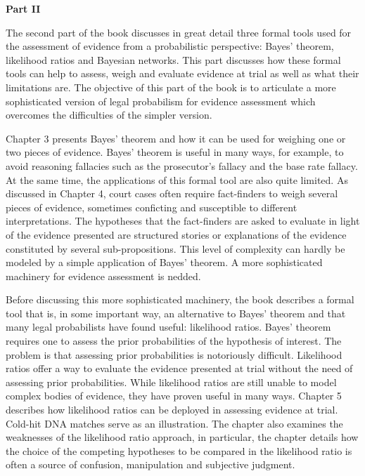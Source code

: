 \documentclass[10pt,dvipsnames,enabledeprecatedfontcommands]{scrartcl}
\begin{document}
\vspace{3mm}

\noindent \textbf{Part II}

\noindent The second part of the book discusses in great detail three
formal tools used for the assessment of evidence from a probabilistic
perspective: Bayes' theorem, likelihood ratios and Bayesian networks.
This part discusses how these formal tools can help to assess, weigh and
evaluate evidence at trial as well as what their limitations are. The
objective of this part of the book is to articulate a more sophisticated
version of legal probabilism for evidence assessment which overcomes the
difficulties of the simpler version.

Chapter 3 presents Bayes' theorem and how it can be used for weighing
one or two pieces of evidence. Bayes' theorem is useful in many ways,
for example, to avoid reasoning fallacies such as the prosecutor's
fallacy and the base rate fallacy. At the same time, the applications of
this formal tool are also quite limited. As discussed in Chapter 4,
court cases often require fact-finders to weigh several pieces of
evidence, sometimes conficting and susceptible to different
interpretations. The hypotheses that the fact-finders are asked to
evaluate in light of the evidence presented are structured stories or
explanations of the evidence constituted by several sub-propositions.
This level of complexity can hardly be modeled by a simple application
of Bayes' theorem. A more sophisticated machinery for evidence
assessment is nedded.

Before discussing this more sophisticated machinery, the book describes
a formal tool that is, in some important way, an alternative to Bayes'
theorem and that many legal probabilists have found useful: likelihood
ratios. Bayes' theorem requires one to assess the prior probabilities of
the hypothesis of interest. The problem is that assessing prior
probabilities is notoriously difficult. Likelihood ratios offer a way to
evaluate the evidence presented at trial without the need of assessing
prior probabilities. While likelihood ratios are still unable to model
complex bodies of evidence, they have proven useful in many ways.
Chapter 5 describes how likelihood ratios can be deployed in assessing
evidence at trial. Cold-hit DNA matches serve as an illustration. The
chapter also examines the weaknesses of the likelihood ratio approach,
in particular, the chapter details how the choice of the competing
hypotheses to be compared in the likelihood ratio is often a source of
confusion, manipulation and subjective judgment.
\end{document}
